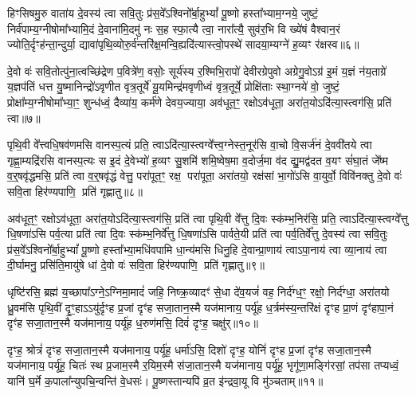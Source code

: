 हिꣳसिषमु॒रु वाता॑य दे॒वस्य॑ त्वा सवि॒तुः प्र॑स॒वे᳚\-ऽश्विनो᳚र्बा॒हु\-भ्यां᳚ पू॒ष्णो हस्ता᳚भ्याम॒ग्नये॒ जुष्टं॒ निर्व॑पाम्य॒ग्नी\-षोमा᳚भ्यामि॒दं दे॒वाना॑मि॒दमु॑ नः स॒ह स्फा॒त्यै त्वा॒ नारा᳚त्यै॒ सुव॑र॒भि वि ख्ये॑षं वैश्वान॒रं ज्योति॒र्दृꣳह॑न्ता॒न्दुर्या॒ द्यावा॑पृथि॒व्योरु॒र्व॑न्तरि॑क्ष॒मन्वि॒ह्यदि॑त्यास्त्वो॒पस्थे॑ सादया॒म्यग्ने॑ ह॒व्यꣳ र॑क्षस्व॥६॥

{\anuvakamend[{मा त्वा॒ षट्च॑त्वारिꣳशच्च। (4)}]}

दे॒वो वः॑ सवि॒तोत्पु॑ना॒त्वच्छि॑द्रेण प॒वित्रे॑ण॒ वसोः॒ सूर्य॑स्य र॒श्मिभि॒रापो॑ देवीरग्रेपुवो अग्रेगु॒वो\-ऽग्र॑ इ॒मं य॒ज्ञं न॑य॒ताग्रे॑ य॒ज्ञप॑तिं धत्त यु॒ष्मानिन्द्रो॑\-ऽवृणीत वृत्र॒तूर्ये॑ यू॒यमिन्द्र॑मवृणीध्वं वृत्र॒तूर्ये॒ प्रोक्षि॑ताः स्था॒ग्नये॑ वो॒ जुष्टं॒ प्रोक्षा᳚म्य॒ग्नीषोमा᳚भ्या॒ꣳ॒ शुन्ध॑ध्वं॒ दैव्या॑य॒ कर्म॑णे देवय॒ज्याया॒ अव॑धूत॒ꣳ॒ रक्षो\-ऽव॑धूता॒ अरा॑त॒यो\-ऽदि॑त्या॒स्त्वग॑सि॒ प्रति॑ त्वा॥७॥

पृथि॒वी वे᳚त्त्वधि॒षव॑णमसि वानस्प॒त्यं प्रति॒ त्वा\-ऽदि॑त्या॒स्त्वग्वे᳚त्त्व॒ग्नेस्त॒नूर॑सि वा॒चो वि॒सर्ज॑नं दे॒ववी॑तये त्वा गृह्णा॒म्यद्रि॑रसि वानस्प॒त्यः स इ॒दं दे॒वेभ्यो॑ ह॒व्यꣳ सु॒शमि॑ शमि॒ष्वेष॒मा व॒दोर्ज॒मा व॑द द्यु॒मद्व॑दत व॒यꣳ सं॑घा॒तं जे᳚ष्म व॒र्॒षवृ॑द्धमसि॒ प्रति॑ त्वा व॒र्॒षवृ॑द्धं वेत्तु॒ परा॑पूत॒ꣳ॒ रक्ष॒ परा॑पूता॒ अरा॑तयो॒ रक्ष॑सां भा॒गो॑\-ऽसि वा॒युर्वो॒ विवि॑नक्तु दे॒वो वः॑ सवि॒ता हिर॑ण्यपाणि॒ प्रति॑ गृह्णातु॥८॥

{\anuvakamend[{त्वा॒ भा॒ग एका॑दश च। (5)}]}

अव॑धूत॒ꣳ॒ रक्षो\-ऽव॑धूता॒ अरा॑त॒यो\-ऽदि॑त्या॒स्त्वग॑सि॒ प्रति॑ त्वा पृथि॒वी वे᳚त्तु दि॒वः स्क॑म्भ॒निर॑सि॒ प्रति॒ त्वा\-ऽदि॑त्या॒स्त्वग्वे᳚त्तु धि॒षणा॑\-ऽसि पर्व॒त्या प्रति॑ त्वा दि॒वः स्क॑म्भ॒निर्वे᳚त्तु धि॒षणा॑\-ऽसि पार्वते॒यी प्रति॑ त्वा पर्व॒तिर्वे᳚त्तु दे॒वस्य॑ त्वा सवि॒तुः प्र॑स॒वे᳚\-ऽश्विनो᳚र्बा॒हु\-भ्यां᳚ पू॒ष्णो हस्ता᳚भ्या॒मधि॑वपामि धा॒न्य॑मसि धिनु॒हि दे॒वान्प्रा॒णाय॑ त्वा\-ऽपा॒नाय॑ त्वा व्या॒नाय॑ त्वा दी॒र्घामनु॒ प्रसि॑ति॒मायु॑षे धां दे॒वो वः॑ सवि॒ता हिर॑ण्यपाणि॒ प्रति॑ गृह्णातु॥९॥

{\anuvakamend[{प्रा॒णाय॑ त्वा॒ पञ्च॑दश च। (6)}]}

धृष्टि॑रसि॒ ब्रह्म॑ य॒च्छापा᳚\-ऽग्ने॒\-ऽग्निमा॒मादं॑ जहि॒ निष्क्र॒व्यादꣳ॑ से॒धा दे॑व॒यजं॑ वह॒ निर्द॑ग्ध॒ꣳ॒ रक्षो॒ निर्द॑ग्धा॒ अरा॑तयो ध्रु॒वम॑सि पृथि॒वीं दृ॒ꣳ॒हाऽऽयु॑र्दृꣳह प्र॒जां दृꣳ॑ह सजा॒तान॒स्मै यज॑मानाय॒ पर्यू॑ह ध॒र्त्रम॑स्य॒न्तरि॑क्षं दृꣳह प्रा॒णं दृꣳ॑हापा॒नं दृꣳ॑ह सजा॒ता\-न॒स्मै यज॑मानाय॒ पर्यू॑ह ध॒रुण॑मसि॒ दिवं॑ दृꣳह॒ चक्षु॑र्॥१०॥

दृꣳह॒ श्रोत्रं॑ दृꣳह सजा॒तान॒स्मै यज॑मानाय॒ पर्यू॑ह॒ धर्मा॑\-ऽसि॒ दिशो॑ दृꣳह॒ योनिं॑ दृꣳह प्र॒जां दृꣳ॑ह सजा॒तान॒स्मै यज॑मानाय॒ पर्यू॑ह॒ चितः॑ स्थ प्र॒जाम॒स्मै र॒यिम॒स्मै स॑जा॒तान॒स्मै यज॑मानाय॒ पर्यू॑ह॒ भृगू॑णा॒मङ्गि॑रसां॒ तप॑सा तप्यध्वं॒ यानि॑ घ॒र्मे क॒पाला᳚न्युपचि॒न्वन्ति॑ वे॒धसः॑। पू॒ष्णस्तान्यपि॑ व्र॒त इ॑न्द्रवा॒यू वि मु॑ञ्चताम्॥११॥

